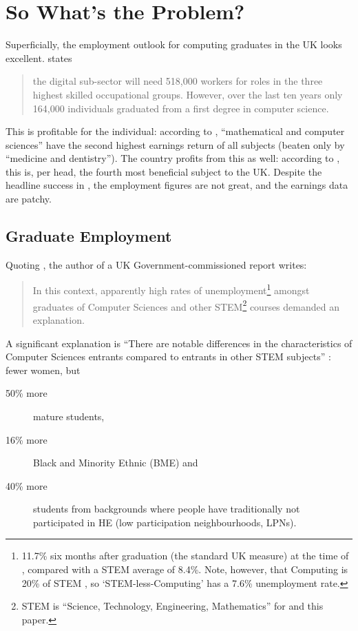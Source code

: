 \documentclass[sigconf,anonymous]{acmart}
\begin{document}
\section{So What's the Problem?}\label{problem}

Superficially, the employment outlook for computing graduates in the
UK looks excellent. \cite[p.~74]{UKCES2015b} states
\begin{quote} the digital sub-sector will need 518,000 workers for
roles in the three highest skilled occupational groups. However, over
the last ten years only 164,000 individuals graduated from a first
degree in computer science.
\end{quote} This is profitable for the individual: according to
\cite[Figure 4]{BIS2011a}, ``mathematical and computer sciences'' have
the second highest earnings return of all subjects (beaten only by
``medicine and dentistry'').  The country profits from this as well:
according to \cite[p.~16]{BIS2011a}, this is, per head, the fourth
most beneficial subject to the UK.
Despite the headline success in \cite{BIS2011a}, the employment
figures are not great, and the earnings data are patchy.

\subsection{Graduate Employment}

Quoting \cite{UKCES2015b}, the author of a UK Government-commissioned
report \cite{Shadbolt2016a} writes:

\begin{quote} In this context, apparently high rates of
unemployment\footnote{11.7\% six months after graduation (the standard
UK measure) at the time of \cite{Shadbolt2016a}, compared with a STEM
average of 8.4\%. Note, however, that Computing is 20\% of STEM
\cite[Table 1]{Wakeham2016a}, so `STEM-less-Computing' has a 7.6\%
unemployment rate.} amongst graduates of Computer Sciences and other
STEM\footnote{STEM is ``Science, Technology, Engineering,
Mathematics'' for \cite{Shadbolt2016a} and this paper.} courses
demanded an explanation.
\end{quote}

A significant explanation is ``There are notable differences in the
characteristics of Computer Sciences entrants compared to entrants in
other STEM subjects'' \cite[\P2.6]{Shadbolt2016a}: fewer women, but

\begin{description}
\item[50\% more] mature students,
\item[16\% more] Black and Minority Ethnic (BME) and
\item[40\% more] students from backgrounds where people have
traditionally not participated in HE (low participation
neighbourhoods, LPNs).
\end{description}
\end{document}
